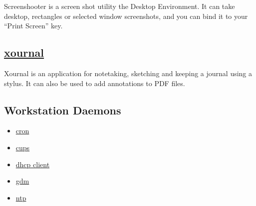  Screenshooter is a screen shot utility the Desktop Environment. It can take
 desktop, rectangles or selected window screenshots, and you can bind it to
 your ``Print Screen'' key.

\subsection{\href{http://xournal.sourceforge.net/}{xournal}}

 Xournal is an application for notetaking, sketching and
 keeping a journal using a stylus. It can also be used to
 add annotations to PDF files.

\subsection{Workstation Daemons}
\begin{itemize}
\item \href{http://ftp.isc.org/isc/cron/}{cron}
\item \href{http://www.cups.org/}{cups}
\item \href{http://www.isc.org/}{dhcp client}
\item \href{https://wiki.gnome.org/Projects/GDM}{gdm}
\item \href{http://support.ntp.org/}{ntp}
\end{itemize}

